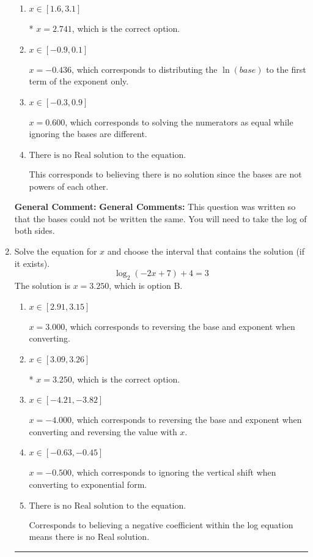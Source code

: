 \documentclass{extbook}[14pt]
\newcommand{\litem}[1]{\item #1

\rule{\textwidth}{0.4pt}}
\begin{document}
\begin{enumerate}
{\begin{enumerate}[label=\Alph*.]
$x = -3.773$, which corresponds to distributing the $\ln(base)$ to the second term of the exponent only.
\item \( x \in [1.6, 3.1] \)

* $x = 2.741$, which is the correct option.
\item \( x \in [-0.9, 0.1] \)

$x = -0.436$, which corresponds to distributing the $\ln(base)$ to the first term of the exponent only.
\item \( x \in [-0.3, 0.9] \)

$x = 0.600$, which corresponds to solving the numerators as equal while ignoring the bases are different.
\item \( \text{There is no Real solution to the equation.} \)

This corresponds to believing there is no solution since the bases are not powers of each other.
\end{enumerate}

\textbf{General Comment:} \textbf{General Comments:} This question was written so that the bases could not be written the same. You will need to take the log of both sides.
}
\litem{
Solve the equation for $x$ and choose the interval that contains the solution (if it exists).
\[ \log_{2}{(-2x+7)}+4 = 3 \]
The solution is \( x = 3.250 \), which is option B.\begin{enumerate}[label=\Alph*.]
\item \( x \in [2.91, 3.15] \)

$x = 3.000$, which corresponds to reversing the base and exponent when converting.
\item \( x \in [3.09, 3.26] \)

* $x = 3.250$, which is the correct option.
\item \( x \in [-4.21, -3.82] \)

$x = -4.000$, which corresponds to reversing the base and exponent when converting and reversing the value with $x$.
\item \( x \in [-0.63, -0.45] \)

$x = -0.500$, which corresponds to ignoring the vertical shift when converting to exponential form.
\item \( \text{There is no Real solution to the equation.} \)

Corresponds to believing a negative coefficient within the log equation means there is no Real solution.
\end{enumerate}

}
\end{enumerate}
\end{document}
